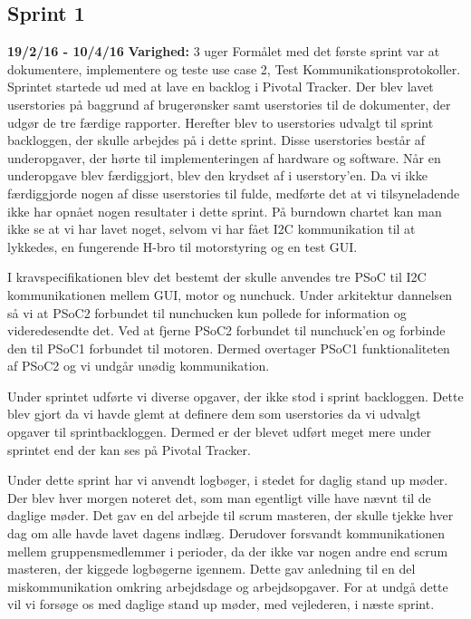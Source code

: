 	\subsection{Sprint 1}
	\textbf{19/2/16 - 10/4/16}\newline
	\textbf{Varighed:} 3 uger\newline
	Formålet med det første sprint var at dokumentere, implementere og teste use case 2, Test Kommunikationsprotokoller.
	Sprintet startede ud med at lave en backlog i Pivotal Tracker. Der blev lavet userstories på baggrund af brugerønsker samt userstories til de dokumenter, der udgør de tre færdige rapporter. Herefter blev to userstories udvalgt til sprint backloggen, der skulle arbejdes på i dette sprint. Disse userstories består af underopgaver, der hørte til implementeringen af hardware og software. Når en underopgave blev færdiggjort, blev den krydset af i userstory'en. Da vi ikke færdiggjorde nogen af disse userstories til fulde, medførte det at vi tilsyneladende ikke har opnået nogen resultater i dette sprint. På burndown chartet kan man ikke se at vi har lavet noget, selvom vi har fået I2C kommunikation til at lykkedes, en fungerende H-bro til motorstyring og en test GUI. \newline
	
	I kravspecifikationen blev det bestemt der skulle anvendes tre PSoC til I2C kommunikationen mellem GUI, motor og nunchuck. Under arkitektur dannelsen så vi at PSoC2 forbundet til nunchucken kun pollede for information og videredesendte det. Ved at fjerne PSoC2 forbundet til nunchuck'en og forbinde den til PSoC1 forbundet til motoren. Dermed overtager PSoC1 funktionaliteten af PSoC2 og vi undgår unødig kommunikation. \newline
	
	Under sprintet udførte vi diverse opgaver, der ikke stod i sprint backloggen. Dette blev gjort da vi havde glemt at definere dem som userstories da vi udvalgt opgaver til sprintbackloggen. Dermed er der blevet udført meget mere under sprintet end der kan ses på Pivotal Tracker. \newline
	
	Under dette sprint har vi anvendt logbøger, i stedet for daglig stand up møder. Der blev hver morgen noteret det, som man egentligt ville have nævnt til de daglige møder. Det gav en del arbejde til scrum masteren, der skulle tjekke hver dag om alle havde lavet dagens indlæg. Derudover forsvandt kommunikationen mellem gruppensmedlemmer i perioder, da der ikke var nogen andre end scrum masteren, der kiggede logbøgerne igennem. Dette gav anledning til en del miskommunikation omkring arbejdsdage og arbejdsopgaver. For at undgå dette vil vi forsøge os med daglige stand up møder, med vejlederen, i næste sprint. \newline
	
